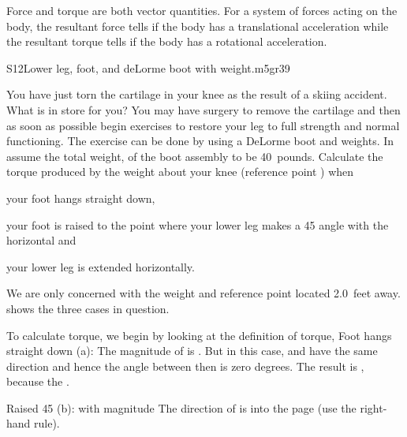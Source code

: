 {{
Force and torque are both vector quantities.
For a system of forces acting on the body, the resultant force tells if the
body has a translational acceleration while the resultant torque tells if
the body has a rotational acceleration.
%

%
                          {S12}{Lower leg, foot, and deLorme boot with weight.}{m5gr39}

You have just torn the cartilage in your knee as the result of a skiing
accident.
What is in store for you?
You may have surgery to remove the cartilage and then as soon as possible
begin exercises to restore your leg to full strength and normal functioning.
The exercise can be done by using a DeLorme boot and weights.
In  assume the total weight,  of the boot assembly to be
40~pounds.
Calculate the torque produced by the weight about your knee (reference point
) when
\begin{one-digit-list}
\item [a.] your foot hangs straight down,
\item [b.] your foot is raised to the point where your lower leg makes a
           {45\degrees} angle with the horizontal and 
\item [c.] your lower leg is extended horizontally.
\end{one-digit-list}
We are only concerned with the weight  and reference point  located
2.0~feet away.
 shows the three cases in question.


To calculate torque, we begin by looking at the definition of torque,
%
%
 Foot hangs straight down (a):
%
%
The magnitude of  is .
But in this case,  and  have the same direction and hence
the angle between then is zero degrees.
The result is , because the .

 Raised {45\degrees} (b):
%
%
with magnitude
%
%
The direction of  is into the page (use the right-hand rule).

}}
